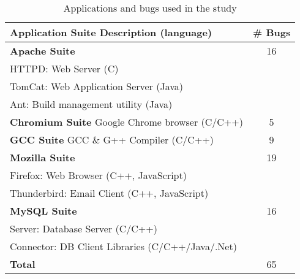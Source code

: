 \begin{table}[h!]
\centering
\small
\begin{tabular}{@{\hspace{3pt}}l@{\hspace{3pt}}|@{\hspace{3pt}}c@{\hspace{3pt}}}
\hline
Application Suite Description (language) & \# Bugs \\
\hline                            
{\bf Apache Suite} 	 & 16\\
{HTTPD:	Web Server (C)	}& \\
{TomCat:  Web Application Server (Java)}& \\
{Ant:	Build management utility (Java)}& \\
\hline                            
{\bf Chromium Suite} Google Chrome browser (C/C++) & 5\\
\hline
{\bf GCC Suite}  GCC \& G++ Compiler (C/C++)     & 9\\
\hline
{\bf Mozilla Suite}  & 19\\
{Firefox: Web Browser (C++, JavaScript)}& 	\\
{Thunderbird: Email Client (C++, JavaScript)}& \\
\hline
{\bf MySQL Suite}     & 16	\\
{Server: Database Server (C/C++)}&  	\\
{Connector: DB Client Libraries (C/C++/Java/.Net)} &  	\\
\hline
{\bf Total}	   & 65 \\
\hline
\end{tabular}
\caption{Applications and bugs used in the study}
\label{tab:app_bug}
\end{table}

